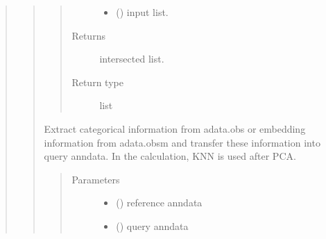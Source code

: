 \documentclass[letterpaper,10pt,english]{sphinxmanual}
\begin{document}
\begin{quote}
\begin{quote}
\begin{fulllineitems}
\begin{quote}
\begin{description}
\begin{itemize}
\item {} 
 () \textendash{} input list.

\end{itemize}

\item[{Returns}] \leavevmode
intersected list.

\item[{Return type}] \leavevmode
list

\end{description}\end{quote}

\end{fulllineitems}


\begin{fulllineitems}
\label{\detokenize{modules/celloracle.utility:celloracle.utility.knn_data_transferer}}
Extract categorical information from adata.obs or embedding information from adata.obsm and transfer these information into query anndata.
In the calculation, KNN is used after PCA.
\begin{quote}\begin{description}
\item[{Parameters}] \leavevmode\begin{itemize}
\item {} 
 () \textendash{} reference anndata

\item {} 
 () \textendash{} query anndata


\end{itemize}
\end{description}
\end{quote}
\end{fulllineitems}
\end{quote}
\end{quote}
\end{document}
